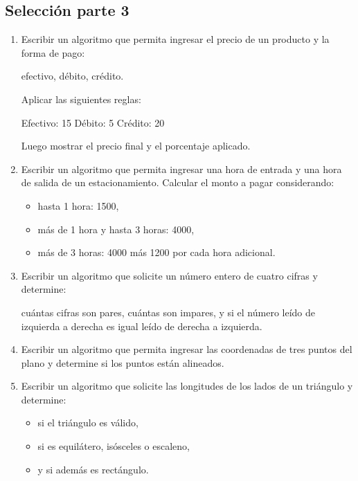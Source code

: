 \begin{ejercicioClase}
  \subsection*{Selección parte 3}
  \begin{enumerate}
    \item Escribir un algoritmo que permita ingresar el precio de un producto y la forma de pago:

    efectivo,
    débito,
    crédito.

    Aplicar las siguientes reglas:

    Efectivo: 15%
    Débito: 5%
    Crédito: 20%

    Luego mostrar el precio final y el porcentaje aplicado.

    \item Escribir un algoritmo que permita ingresar una hora de entrada y una hora de salida de un estacionamiento. Calcular el monto a pagar considerando:

      \begin{itemize}
        \item hasta 1 hora: 1500,
        \item más de 1 hora y hasta 3 horas: 4000,
        \item más de 3 horas: 4000 más 1200 por cada hora adicional.
      \end{itemize}

    \item Escribir un algoritmo que solicite un número entero de cuatro cifras y determine:

    cuántas cifras son pares,
    cuántas son impares,
    y si el número leído de izquierda a derecha es igual leído de derecha a izquierda.

    \item Escribir un algoritmo que permita ingresar las coordenadas de tres puntos del plano y determine si los puntos están alineados.

    \item Escribir un algoritmo que solicite las longitudes de los lados de un triángulo y determine:

      \begin{itemize}
        \item si el triángulo es válido,
        \item si es equilátero, isósceles o escaleno,
        \item y si además es rectángulo.
      \end{itemize}


\end{enumerate}
\end{ejercicioClase}
